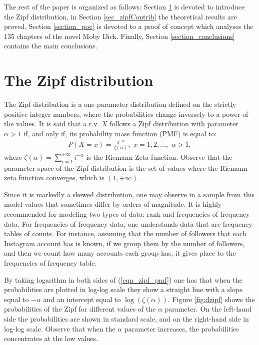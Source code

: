 \documentclass{article}
\begin{document}
The rest of the paper is organized as follows: Section \ref{section_zipf} is devoted to introduce the Zipf distribution, in Section \ref{sec_zipfContrib} the theoretical results are proved. Section \ref{section_poc} is devoted to a proof of concept which analyses the 135 chapters of the novel Moby Dick. Finally, Section \ref{section_conclusions} contains the main conclusions.

\section{The Zipf distribution}
\label{section_zipf}
The Zipf distribution  is a one-parameter distribution defined on the strictly positive integer numbers, where the probabilities change inversely to a power of the values. It is said that a r.v. $X$ follows a Zipf distribution with parameter $\alpha > 1$ if, and only if, its probability mass function (PMF) is equal to:
\begin{align}
\label{eqn_zipf_pmf}
P(X=x) = \frac{x^{-\alpha}}{\zeta(\alpha)},\,\, x = 1,2,...,\,\, \alpha >1,
\end{align}
where $\zeta(\alpha) = \sum_{i=1}^{+\infty} i^{-\alpha}$ is the Riemann Zeta function. Observe that the parameter space of the Zipf distribution is the set of values where the Riemann zeta function converges, which is $(1, +\infty)$.

Since it is markedly a skewed distribution, one may observe in a sample from this model values that sometimes differ by orders of magnitude. It is highly recommended for modeling two types of data: rank and frequencies of frequency data.
For frequencies of frequency data, one understands data that are frequency tables of counts. For instance, assuming that the number of followers that each Instagram account has is known, if we group them by the number of followers, and then we count how many accounts each group has, it gives place to the frequencies of frequency table. 

By taking logarithm in both sides of (\ref{eqn_zipf_pmf}) one has that when the probabilities are  plotted in log-log scale they show a straight line with a slope equal to $-\alpha$ and an intercept equal to $\log(\zeta(\alpha))$. Figure \ref{fig:dzipf} shows the probabilities of the Zipf for different values of the $\alpha$ parameter. On the left-hand side the probabilities are shown in standard scale, and on the right-hand side in log-log scale. Observe that when the $\alpha$ parameter increases, the probabilities concentrates at the low values.
\end{document}
